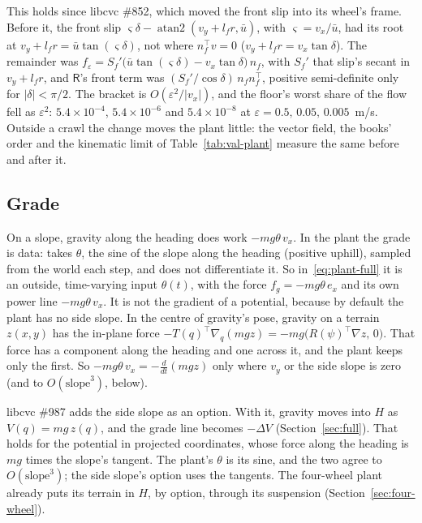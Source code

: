 \documentclass[11pt]{article}
\theoremstyle{remark}
\newcommand{\R}{\mathsf R}
\newcommand{\ub}{\bar u}
\newcommand{\T}{^{\top}}
\begin{document}
This holds since libcvc \#852, which moved the front slip into its wheel's frame. Before it, the
front slip $\varsigma\delta-\operatorname{atan2}(v_y+l_fr,\ub)$, with $\varsigma=v_x/\ub$, had its
root at $v_y+l_fr=\ub\tan(\varsigma\delta)$, not where $n_f\T v=0$ ($v_y+l_fr=v_x\tan\delta$). The
remainder was $f_\varepsilon=S_f'\big(\ub\tan(\varsigma\delta)-v_x\tan\delta\big)\,n_f$, with $S_f'$ that
slip's secant in $v_y+l_fr$, and $\R$'s front term was $(S_f'/\cos\delta)\,n_fn_f\T$, positive
semi-definite only for $\lvert\delta\rvert<\pi/2$. The bracket is $O(\varepsilon^2/\lvert v_x\rvert)$,
and the floor's worst share of the flow fell as $\varepsilon^2$: $5.4\times10^{-4}$,
$5.4\times10^{-6}$ and $5.4\times10^{-8}$ at $\varepsilon=0.5,\,0.05,\,0.005$~m/s. Outside a crawl
the change moves the plant little: the vector field, the books' order and the kinematic limit of
Table~\ref{tab:val-plant} measure the same before and after it.

\subsection{Grade}
\label{sec:grade}
On a slope, gravity along the heading does work $-mg\theta\,v_x$. In the plant the grade is data:
 takes $\theta$, the sine of the slope along the heading (positive uphill), sampled
from the world each step, and does not differentiate it. So in~\eqref{eq:plant-full} it is an
outside, time-varying input $\theta(t)$, with the force $f_g=-mg\theta\,e_x$ and its own power line
$-mg\theta\,v_x$. It is not the gradient of a potential, because by default the plant has no side
slope. In
the centre of gravity's pose, gravity on a terrain $z(x,y)$ has the in-plane force
$-T(q)\T\nabla_q(mgz)=-mg\big(R(\psi)\T\nabla z,\,0\big)$. That force has a component along the
heading and one across it, and the plant keeps only the first. So $-mg\theta\,v_x=-\tfrac
d{dt}(mgz)$ only where $v_y$ or the side slope is zero (and to $O(\text{slope}^3)$, below).

libcvc \#987 adds the side slope as an option. With it, gravity moves into $H$ as
$V(q)=mg\,z(q)$, and the grade line becomes $-\Delta V$ (Section~\ref{sec:full}). That holds for
the potential in projected coordinates, whose force along the heading is $mg$ times the slope's
tangent. The plant's $\theta$ is its sine, and the two agree to $O(\text{slope}^3)$; the side
slope's option uses the tangents. The four-wheel plant already
puts its terrain in $H$, by option, through its suspension (Section~\ref{sec:four-wheel}).
\end{document}
